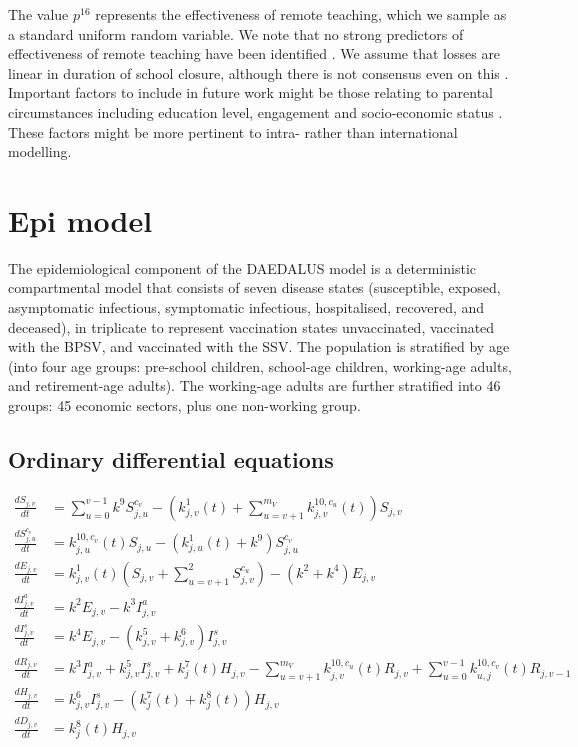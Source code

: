 \documentclass[
]{article}
\begin{document}
The value \(p^{16}\) represents the effectiveness of remote teaching, which we sample as a standard uniform random variable. We note that no strong predictors of effectiveness of remote teaching have been identified \citep{Patrinos2023}. We assume that losses are linear in duration of school closure, although there is not consensus even on this \citep{Betthauser2023}. Important factors to include in future work might be those relating to parental circumstances including education level, engagement and socio-economic status \citep{Moscoviz2022}. These factors might be more pertinent to intra- rather than international modelling.

\section{Epi model}\label{epi-model}

The epidemiological component of the DAEDALUS model is a deterministic compartmental model that consists of seven disease states (susceptible, exposed, asymptomatic infectious, symptomatic infectious, hospitalised, recovered, and deceased), in triplicate to represent vaccination states unvaccinated, vaccinated with the BPSV, and vaccinated with the SSV. The population is stratified by age (into four age groups: pre-school children, school-age children, working-age adults, and retirement-age adults). The working-age adults are further stratified into 46 groups: 45 economic sectors, plus one non-working group.

\subsection{Ordinary differential equations}\label{ordinary-differential-equations}

\begin{align}
\frac{dS_{j,v}}{dt} & = \sum_{u=0}^{v-1}k^9S_{j,u}^{c_v} - \left( k_{j,v}^{1}(t) + \sum_{u=v+1}^{{m_V}}k_{j,v}^{10,c_u}(t) \right)S_{j,v} \\
\frac{dS_{j,u}^{c_v}}{dt} & = k_{j,u}^{10,c_v}(t)S_{j,u} -\left( k_{j,u}^{1}(t) + k^9 \right)S_{j,u}^{c_v}  \\
\frac{dE_{j,v}}{dt} & = k_{j,v}^{1}(t)\left(S_{j,v}+\sum_{u=v+1}^2S_{j,v}^{c_u}\right) - (k^2+k^4)E_{j,v} \\
\frac{dI_{j,v}^a}{dt} & = k^2E_{j,v} - k^3I_{j,v}^a \\
\frac{dI_{j,v}^s}{dt} & = k^4E_{j,v} - (k_{j,v}^{5}+k_{j,v}^{6})I_{j,v}^s \\
\frac{dR_{j,v}}{dt} & = k^3I_{j,v}^a + k_{j,v}^{5}I_{j,v}^s + k_{j}^{7}(t) H_{j,v} - \sum_{u=v+1}^{{m_V}}k_{j,v}^{10,c_u}(t)R_{j,v} + \sum_{u=0}^{v-1}k_{u,j}^{10,c_v}(t)R_{j,v-1}\\
\frac{dH_{j,v}}{dt} & = k_{j,v}^{6}I_{j,v}^s - (k_{j}^{7}(t) + k_{j}^{8}(t)) H_{j,v} \\
\frac{dD_{j,v}}{dt} & =  k_{j}^{8}(t) H_{j,v}
\end{align}
\end{document}
